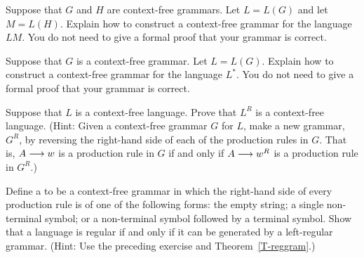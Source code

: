 \begin{exercises}
\problem Suppose that $G$ and $H$ are context-free grammars.
Let $L=L(G)$ and let $M=L(H)$.  Explain how to construct
a context-free grammar for the language $LM$.  You do not
need to give a formal proof that your grammar is correct.

\problem Suppose that $G$ is a context-free grammar.
Let $L=L(G)$.  Explain how to construct
a context-free grammar for the language $L^*$.  You do not
need to give a formal proof that your grammar is correct.

\problem Suppose that $L$ is a context-free language.
Prove that $L^R$ is a context-free language.  (Hint:
Given a context-free grammar $G$ for $L$, make a new grammar, $G^R$,
by reversing the right-hand side of each of the production
rules in $G$.  That is, $A\longrightarrow w$ is a production rule in
$G$ if and only if $A\longrightarrow w^R$ is a production rule in $G^R$.)

\problem Define a 
to be a context-free grammar in which the right-hand side of
every production rule is of one of the following forms:
the empty string; a single non-terminal symbol; or a non-terminal
symbol followed by a terminal symbol.  Show that a language is
regular if and only if it can be generated by a left-regular
grammar.  (Hint: Use the preceding exercise and Theorem~\ref{T-reggram}.)




\end{exercises}



